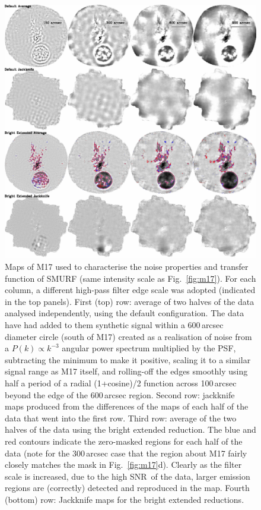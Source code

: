 \documentclass[useAMS,usenatbib,nofootinbib]{mn2e}
\newcommand{\snr}{SNR}
\begin{document}
\begin{figure}
\centering
\includegraphics[width=\linewidth]{m17_jk}
\caption{Maps of M17 used to characterise the noise properties and
transfer function of SMURF (same intensity scale as
Fig.~\ref{fig:m17}). For each column, a different high-pass filter
edge scale was adopted (indicated in the top panels). First (top) row:
average of two halves of the data analysed independently, using the
default configuration. The data have had added to them synthetic
signal within a 600\,arcsec diameter circle (south of M17) created as
a realisation of noise from a $P(k) \propto k^{-3}$ angular power
spectrum multiplied by the PSF, subtracting the minimum to make it
positive, scaling it to a similar signal range as M17 itself, and
rolling-off the edges smoothly using half a period of a radial
(1+cosine)/2 function across 100\,arcsec beyond the edge of the
600\,arcsec region. Second row: jackknife maps produced from the
differences of the maps of each half of the data that went into the
first row. Third row: average of the two halves of the data using the
bright extended reduction. The blue and red contours indicate the
zero-masked regions for each half of the data (note for the
300\,arcsec case that the region about M17 fairly closely matches the
mask in Fig.~\ref{fig:m17}d). Clearly as the filter scale is
increased, due to the high \snr\ of the data, larger emission regions
are (correctly) detected and reproduced in the map. Fourth (bottom)
row: Jackknife maps for the bright extended reductions.}
\label{fig:m17_jk}
\end{figure}
\end{document}
